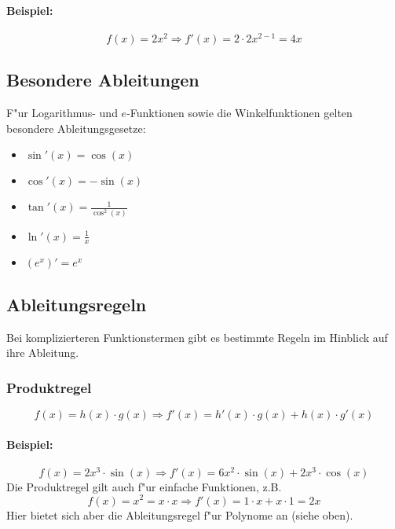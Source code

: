 \paragraph{Beispiel:}
\begin{equation*}
f(x)=2x^2 \Rightarrow f'(x)= 2 \cdot 2x^{2-1}=4x
\end{equation*}

\subsection{Besondere Ableitungen}
F"ur Logarithmus- und $e$-Funktionen sowie die Winkelfunktionen gelten besondere Ableitungsgesetze:
\begin{itemize}
\item $\sin'(x) = \cos(x)$
\item $\cos'(x) = - \sin(x)$
\item $\tan'(x) = \frac{1}{\cos^2(x)}$
\item $\ln'(x) = \frac{1}{x}$
\item $(e^x)' = e^x$
\end{itemize}

\subsection{Ableitungsregeln}
Bei komplizierteren Funktionstermen gibt es bestimmte Regeln im Hinblick auf ihre Ableitung.

\subsubsection{Produktregel}
\begin{equation*}
f(x) = h(x) \cdot g(x) \Rightarrow f'(x)=h'(x) \cdot g(x)+h(x) \cdot g'(x)
\end{equation*}

\paragraph{Beispiel:}
\begin{equation*}
f(x)=2x^3 \cdot \sin(x)\Rightarrow f'(x)=6x^2 \cdot \sin(x)+2x^3 \cdot \cos(x)
\end{equation*}
Die Produktregel gilt auch f"ur einfache Funktionen, z.B.
\begin{equation*}
f(x)=x^2=x\cdot x\Rightarrow f'(x)=1 \cdot x+x \cdot 1 = 2x
\end{equation*}
Hier bietet sich aber die Ableitungsregel f"ur Polynome an (siehe oben).

